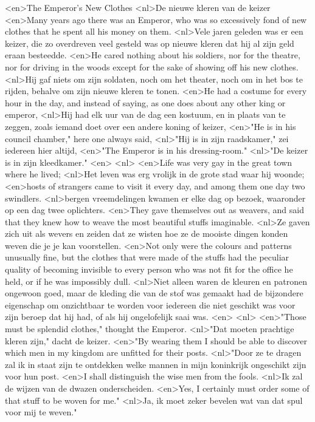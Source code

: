 <en>The Emperor's New Clothes
<nl>De nieuwe kleren van de keizer
<en>Many years ago there was an Emperor, who was so excessively fond of new clothes that he spent all his money on them.
<nl>Vele jaren geleden was er een keizer, die zo overdreven veel gesteld was op nieuwe kleren dat hij al zijn geld eraan besteedde.
<en>He cared nothing about his soldiers, nor for the theatre, nor for driving in the woods except for the sake of showing off his new clothes.
<nl>Hij gaf niets om zijn soldaten, noch om het theater, noch om in het bos te rijden, behalve om zijn nieuwe kleren te tonen.
<en>He had a costume for every hour in the day, and instead of saying, as one does about any other king or emperor,
<nl>Hij had elk uur van de dag een kostuum, en in plaats van te zeggen, zoals iemand doet over een andere koning of keizer,
<en>"He is in his council chamber," here one always said,
<nl>"Hij is in zijn raadskamer," zei iedereen hier altijd,
<en>"The Emperor is in his dressing-room."
<nl>"De keizer is in zijn kleedkamer."
<en>
<nl>
<en>Life was very gay in the great town where he lived;
<nl>Het leven was erg vrolijk in de grote stad waar hij woonde;
<en>hosts of strangers came to visit it every day, and among them one day two swindlers.
<nl>bergen vreemdelingen kwamen er elke dag op bezoek, waaronder op een dag twee oplichters.
<en>They gave themselves out as weavers, and said that they knew how to weave the most beautiful stuffs imaginable.
<nl>Ze gaven zich uit als wevers en zeiden dat ze wisten hoe ze de mooiste dingen konden weven die je je kan voorstellen.
<en>Not only were the colours and patterns unusually fine, but the clothes that were made of the stuffs had the peculiar quality of becoming invisible to every person who was not fit for the office he held, or if he was impossibly dull.
<nl>Niet alleen waren de kleuren en patronen ongewoon goed, maar de kleding die van de stof was gemaakt had de bijzondere eigenschap om onzichtbaar te worden voor iedereen die niet geschikt was voor zijn beroep dat hij had, of als hij ongelofelijk saai was.
<en>
<nl>
<en>"Those must be splendid clothes," thought the Emperor.
<nl>"Dat moeten prachtige kleren zijn," dacht de keizer.
<en>"By wearing them I should be able to discover which men in my kingdom are unfitted for their posts.
<nl>"Door ze te dragen zal ik in staat zijn te ontdekken welke mannen in mijn koninkrijk ongeschikt zijn voor hun post.
<en>I shall distinguish the wise men from the fools.
<nl>Ik zal de wijzen van de dwazen onderscheiden.
<en>Yes, I certainly must order some of that stuff to be woven for me."
<nl>Ja, ik moet zeker bevelen wat van dat spul voor mij te weven."
